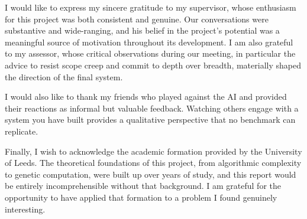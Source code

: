I would like to express my sincere gratitude to my supervisor, whose enthusiasm for this project was both consistent and genuine. Our conversations were substantive and wide-ranging, and his belief in the project's potential was a meaningful source of motivation throughout its development. I am also grateful to my assessor, whose critical observations during our meeting, in particular the advice to resist scope creep and commit to depth over breadth, materially shaped the direction of the final system.

I would also like to thank my friends who played against the AI and provided their reactions as informal but valuable feedback. Watching others engage with a system you have built provides a qualitative perspective that no benchmark can replicate.

Finally, I wish to acknowledge the academic formation provided by the University of Leeds. The theoretical foundations of this project, from algorithmic complexity to genetic computation, were built up over years of study, and this report would be entirely incomprehensible without that background. I am grateful for the opportunity to have applied that formation to a problem I found genuinely interesting.

